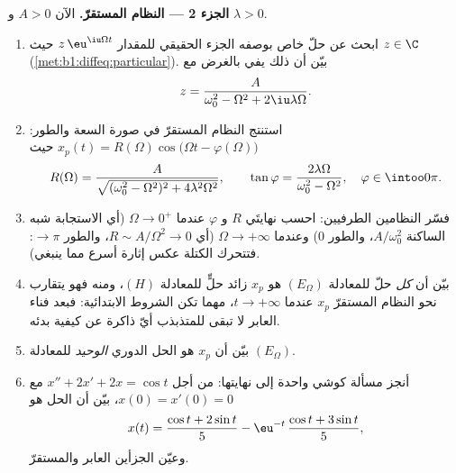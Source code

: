 \begin{problem}
\medskip
\noindent\textbf{الجزء 2 --- النظام المستقرّ.} الآن $A > 0$ و
$\lambda > 0$.
\begin{enumerate}[resume]
  \item ابحث عن حلّ خاص بوصفه الجزء الحقيقي للمقدار
        $z\,\eu^{\iu\Omega t}$ حيث $z \in \C$
        (\cref{met:b1:diffeq:particular}). بيّن أن ذلك يفي بالغرض
        مع
        \[
        z = \frac{A}{\omega_0^2 - \Omega^2 + 2\iu\lambda\Omega} .
        \]
  \item استنتج النظام المستقرّ في صورة السعة والطور:
        $x_p(t) = R(\Omega)\cos\bigl(\Omega t -
        \varphi(\Omega)\bigr)$ حيث
        \[
        R(\Omega) = \frac{A}{\sqrt{(\omega_0^2 - \Omega^2)^2 +
        4\lambda^2\Omega^2}},
        \qquad
        \tan\varphi = \frac{2\lambda\Omega}{\omega_0^2 -
        \Omega^2},
        \quad \varphi \in \intoo0\pi .
        \]
  \item فسّر النظامين الطرفيين: احسب نهايتَي
        $R$ و $\varphi$ عندما $\Omega \to 0^+$ (أي الاستجابة
        شبه الساكنة $A/\omega_0^2$، والطور $0$) وعندما $\Omega \to
        +\infty$ (أي $R \sim A/\Omega^2 \to 0$، والطور $\to \pi$: فتتحرك
        الكتلة عكس إثارة أسرع مما ينبغي).
  \item بيّن أن \emph{كل} حلّ للمعادلة $(E_\Omega)$ هو $x_p$
        زائد حلٍّ للمعادلة $(H)$، ومنه فهو يتقارب نحو النظام
        المستقرّ $x_p$ عندما $t \to +\infty$، مهما تكن الشروط
        الابتدائية: فبعد فناء العابر لا تبقى للمتذبذب
        أيّ ذاكرة عن كيفية بدئه.
  \item بيّن أن $x_p$ هو الحل الدوري \emph{الوحيد} للمعادلة
        $(E_\Omega)$.
  \item أنجز مسألة كوشي واحدة إلى نهايتها: من أجل $x'' + 2x' + 2x =
        \cos t$ مع $x(0) = x'(0) = 0$، بيّن أن الحل هو
        \[
        x(t) = \frac{\cos t + 2\sin t}5
        - \eu^{-t}\,\frac{\cos t + 3\sin t}5 ,
        \]
        وعيّن الجزأين العابر والمستقرّ.
\end{enumerate}


\end{problem}

